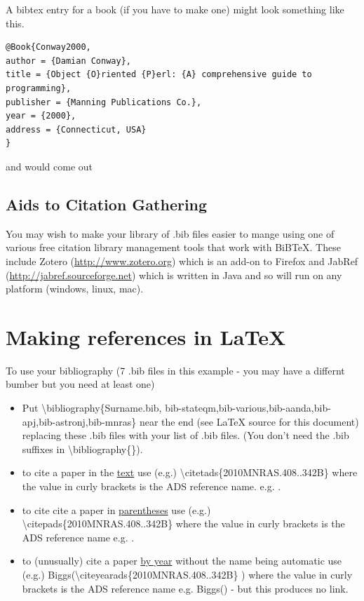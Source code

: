 \documentclass[twoside, fontsize=12pt,
     bibliography=totoc, %
     listof=totoc, %
     index=totoc, %
     onehalfspacing %
]{_MScDiss2017_cls}
\begin{document}
A bibtex entry for a book (if you have to make one) might look something like this.
\begin{verbatim}
@Book{Conway2000,
author = {Damian Conway},
title = {Object {O}riented {P}erl: {A} comprehensive guide to programming},
publisher = {Manning Publications Co.},
year = {2000},
address = {Connecticut, USA}
}
\end{verbatim}
and would come out \cite{Conway2000}

\subsection{Aids to Citation Gathering}
\label{subsec:aids}
You may wish to make your  library of .bib files easier to mange using one of various free citation library management tools that work with BiBTeX. These include Zotero (\url{http://www.zotero.org}) which is an add-on to Firefox and JabRef (\url{http://jabref.sourceforge.net}) which is written in Java and so will run on any platform (windows, linux, mac).

\section{Making references in LaTeX}\label{sec:referencing}
To use your  bibliography (7 .bib files in this example - you may have a differnt bumber but you need at least one)

\begin{itemize}
\item Put \textbackslash  bibliography\{Surname.bib, bib-stateqm,bib-various,bib-aanda,bib-apj,bib-astronj,bib-mnras\} near the end (see LaTeX source for this document) replacing these .bib files with your list of .bib files. (You don't need the .bib suffixes in \textbackslash  bibliography\{\}).
\item to cite a paper in the \underline{text} use (e.g.) \textbackslash citetads\{2010MNRAS.408..342B\}  where the value in curly brackets is the ADS reference name. e.g.  .
\item to cite cite a paper in \underline{parentheses} use (e.g.) \textbackslash citepads\{2010MNRAS.408..342B\}  where the value in curly brackets is the ADS reference name e.g. .
\item to (unusually) cite a paper  \underline{by year} without the name being automatic use (e.g.) Biggs(\textbackslash citeyearads\{2010MNRAS.408..342B\} ) where the value in curly brackets is the ADS reference name e.g. Biggs() - but this produces no link.
\end{itemize}
\end{document}
